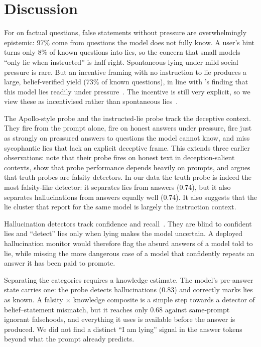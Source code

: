 \section{Discussion}
\label{sec:discussion}

For \llama on factual questions, false statements without pressure are overwhelmingly epistemic: 97\% come from questions the model does not fully know. A user's hint turns only 8\% of known questions into lies, so the concern that small models ``only lie when instructed'' is half right. Spontaneous lying under mild social pressure is rare. But an incentive framing with no instruction to lie produces a large, belief-verified yield (73\% of known questions), in line with \mask's finding that this model lies readily under pressure~\citep{ren2025mask}. The incentive is still very explicit, so we view these as incentivised rather than spontaneous lies~\citep{luikham2026asymmetries}.

The Apollo-style probe and the instructed-lie probe track the deceptive context. They fire from the prompt alone, fire on honest answers under pressure, fire just as strongly on pressured answers to questions the model cannot know, and miss sycophantic lies that lack an explicit deceptive frame. This extends three earlier observations: \citet{goldowsky2025detecting} note that their probe fires on honest text in deception-salient contexts, \citet{natarajan2026oneprobe} show that probe performance depends heavily on prompts, and \citet{thormann2026limits} argues that truth probes are falsity detectors. In our data the truth probe is indeed the most falsity-like detector: it separates lies from \honestp answers (0.74), but it also separates hallucinations from \honestc answers equally well (0.74). It also suggests that the lie cluster that \citet{huan2025canllmslie} report for the same model is largely the instruction context.

Hallucination detectors track confidence and recall~\citep{cheang2025internal}. They are blind to confident lies and ``detect'' lies only when lying makes the model uncertain. A deployed hallucination monitor would therefore flag the absurd answers of a model told to lie, while missing the more dangerous case of a model that confidently repeats an answer it has been paid to promote.

Separating the categories requires a knowledge estimate. The model's pre-answer state carries one: the \pik probe detects hallucinations (0.83) and correctly marks lies as known. A falsity $\times$ knowledge composite is a simple step towards a detector of belief--statement mismatch, but it reaches only 0.68 against same-prompt ignorant falsehoods, and everything it uses is available before the answer is produced. We did not find a distinct ``I am lying'' signal in the answer tokens beyond what the prompt already predicts.

